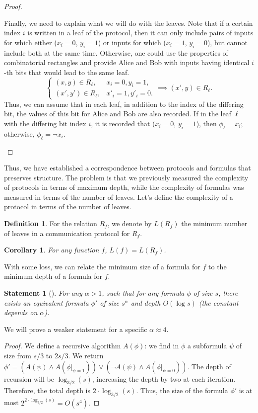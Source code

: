 \documentclass[12pt,sans]{article}
\theoremstyle{definition}
\newtheorem{definition}{Definition}[section]
\theoremstyle{plain}
\newtheorem{statement}{Statement}[section]
\newtheorem{corollary}{Corollary}[section]
\theoremstyle{remark}
\begin{document}
\begin{proof}
\begin{itemize}
        Finally, we need to explain what we will do with the leaves. Note that if a certain index $i$ is written in a leaf of the protocol, then it can only include pairs of inputs for which either ($x_i = 0$, $y_i = 1$) or inputs for which ($x_i = 1$, $y_i = 0$), but cannot include both at the same time. Otherwise, one could use the properties of combinatorial rectangles and provide Alice and Bob with inputs having identical $i$-th bits that would lead to the same leaf.
        \[
        \begin{cases}
            (x,y) \in R_\ell, & x_i = 0, y_i = 1,\\
            (x',y') \in R_\ell, & x'_i = 1, y'_i = 0.
        \end{cases} \implies (x', y) \in R_\ell.
        \]
        Thus, we can assume that in each leaf, in addition to the index of the differing bit, the values of this bit for Alice and Bob are also recorded. If in the leaf $\ell$ with the differing bit index $i$, it is recorded that ($x_i = 0$, $y_i = 1$), then $\phi_\ell = x_i$; otherwise, $\phi_\ell = \neg x_i$. \qedhere
    \end{itemize}
\end{proof}

Thus, we have established a correspondence between protocols and formulas that preserves structure. The problem is that we previously measured the complexity of protocols in terms of maximum depth, while the complexity of formulas was measured in terms of the number of leaves. Let's define the complexity of a protocol in terms of the number of leaves.

\begin{definition}
    For the relation $R_f$, we denote by $L(R_f)$ the minimum number of leaves in a communication protocol for $R_f$.
\end{definition}

\begin{corollary}
    For any function $f$, $L(f) = L(R_f)$.
\end{corollary}

With some loss, we can relate the minimum size of a formula for $f$ to the minimum depth of a formula for $f$.
\begin{statement}[\cite{BB94}]
    For any $\alpha > 1$, such that for any formula $\phi$ of size $s$, there exists an equivalent formula $\phi'$ of size $s^\alpha$ and depth $O(\log s)$ (the constant depends on $\alpha$).
\end{statement}
We will prove a weaker statement for a specific $\alpha \approx 4$.
\begin{proof}
    We define a recursive algorithm $A(\phi)$:
    we find in $\phi$ a subformula $\psi$ of size from $s/3$ to $2s/3$.
    We return $\phi' = (A(\psi) \land A(\phi|_{\psi = 1})) \lor (\neg A(\psi) \land A(\phi|_{\psi = 0})).$
    The depth of recursion will be $\log_{3/2}(s)$, increasing the depth by two at each iteration.
    Therefore, the total depth is $2 \cdot \log_{3/2}(s)$. Thus, the size of the formula $\phi'$ is at most
    $2^{2 \cdot \log_{3/2}(s)} = O(s^4).$
\end{proof}
\end{document}

